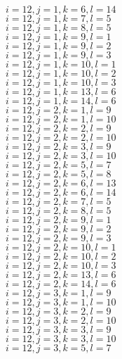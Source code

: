 \documentclass[14pt]{article}
\begin{document}
    $i=12,j=1,k=6,l=14 $ \\ 
    $i=12,j=1,k=7,l=5 $ \\ 
    $i=12,j=1,k=8,l=5 $ \\ 
    $i=12,j=1,k=9,l=1 $ \\ 
    $i=12,j=1,k=9,l=2 $ \\ 
    $i=12,j=1,k=9,l=3 $ \\ 
    $i=12,j=1,k=10,l=1 $ \\ 
    $i=12,j=1,k=10,l=2 $ \\ 
    $i=12,j=1,k=10,l=3 $ \\ 
    $i=12,j=1,k=13,l=6 $ \\ 
    $i=12,j=1,k=14,l=6 $ \\ 
    $i=12,j=2,k=1,l=9 $ \\ 
    $i=12,j=2,k=1,l=10 $ \\ 
    $i=12,j=2,k=2,l=9 $ \\ 
    $i=12,j=2,k=2,l=10 $ \\ 
    $i=12,j=2,k=3,l=9 $ \\ 
    $i=12,j=2,k=3,l=10 $ \\ 
    $i=12,j=2,k=5,l=7 $ \\ 
    $i=12,j=2,k=5,l=8 $ \\ 
    $i=12,j=2,k=6,l=13 $ \\ 
    $i=12,j=2,k=6,l=14 $ \\ 
    $i=12,j=2,k=7,l=5 $ \\ 
    $i=12,j=2,k=8,l=5 $ \\ 
    $i=12,j=2,k=9,l=1 $ \\ 
    $i=12,j=2,k=9,l=2 $ \\ 
    $i=12,j=2,k=9,l=3 $ \\ 
    $i=12,j=2,k=10,l=1 $ \\ 
    $i=12,j=2,k=10,l=2 $ \\ 
    $i=12,j=2,k=10,l=3 $ \\ 
    $i=12,j=2,k=13,l=6 $ \\ 
    $i=12,j=2,k=14,l=6 $ \\ 
    $i=12,j=3,k=1,l=9 $ \\ 
    $i=12,j=3,k=1,l=10 $ \\ 
    $i=12,j=3,k=2,l=9 $ \\ 
    $i=12,j=3,k=2,l=10 $ \\ 
    $i=12,j=3,k=3,l=9 $ \\ 
    $i=12,j=3,k=3,l=10 $ \\ 
    $i=12,j=3,k=5,l=7 $ \\ 
\end{document}

